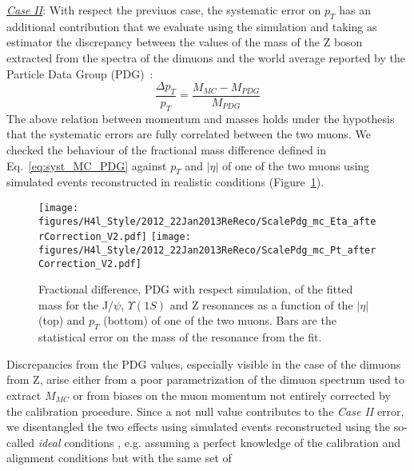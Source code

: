 \underline{\sl Case II}: With respect the previuos case, the
systematic error on $p_T$ has an additional contribution that we
evaluate using the simulation and taking as estimator the discrepancy
between the values of the mass of the Z boson extracted from the
spectra of the dimuons and the world average reported by the Particle
Data Group (PDG)~\cite{Beringer:1900zz}: 
\begin{equation}
  \frac{\Delta p_T}{p_T}=\frac{M_{MC}-M_{PDG}}{M_{PDG}}
  \label{eq:syst_MC_PDG}
\end{equation}
The above relation between momentum
and masses holds under the hypothesis that the systematic errors are fully correlated between the two muons. 
We checked the behaviour of the fractional mass difference defined
in Eq.~\ref{eq:syst_MC_PDG} against $p_T$ and $|\eta|$ of one of the two
muons using simulated events reconstructed in realistic conditions
(Figure~\ref{fig:ScalePDGMC_8TeV}). 
\begin{figure}[hbtp]  
\begin{center}
\texttt{[image: figures/H4l\_Style/2012\_22Jan2013ReReco/ScalePdg\_mc\_Eta\_afterCorrection\_V2.pdf]}
\texttt{[image: figures/H4l\_Style/2012\_22Jan2013ReReco/ScalePdg\_mc\_Pt\_afterCorrection\_V2.pdf]} 
 \hspace{1cm} 
   \caption{Fractional difference, PDG with respect simulation, of the fitted mass for the J/$\psi$,
     $\Upsilon(1S)$ and Z resonances as a function of the $|\eta|$ (top)
     and $p_T$ (bottom) of one of the two muons. Bars are the
     statistical error on the mass of the resonance from the fit.
   \label{fig:ScalePDGMC_8TeV}}
 \end{center}
\end{figure} 
Discrepancies from the PDG values, especially visible in the case of
the dimuons from Z, arise either
from a poor parametrization of the dimuon spectrum used to extract $M_{MC}$ or from biases on the muon momentum not entirely corrected by the
calibration procedure.
Since a not null value contributes 
to the {\sl Case II} error,
we disentangled the two effects using
simulated events reconstructed using the so-called {\sl ideal}
conditions , e.g. assuming a perfect knowledge of the
calibration and alignment conditions but with the same set of
